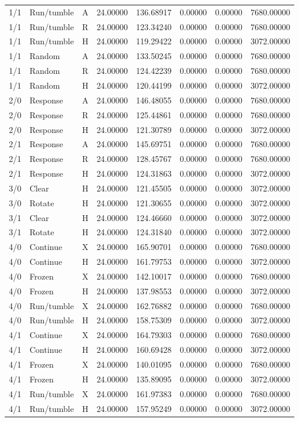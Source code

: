 \begin{longtable}{llllllll}
1/1 & Run/tumble & A & 24.00000 & 136.68917 & 0.00000 & 0.00000 & 7680.00000 \\
1/1 & Run/tumble & R & 24.00000 & 123.34240 & 0.00000 & 0.00000 & 7680.00000 \\
1/1 & Run/tumble & H & 24.00000 & 119.29422 & 0.00000 & 0.00000 & 3072.00000 \\
1/1 & Random & A & 24.00000 & 133.50245 & 0.00000 & 0.00000 & 7680.00000 \\
1/1 & Random & R & 24.00000 & 124.42239 & 0.00000 & 0.00000 & 7680.00000 \\
1/1 & Random & H & 24.00000 & 120.44199 & 0.00000 & 0.00000 & 3072.00000 \\
2/0 & Response & A & 24.00000 & 146.48055 & 0.00000 & 0.00000 & 7680.00000 \\
2/0 & Response & R & 24.00000 & 125.44861 & 0.00000 & 0.00000 & 7680.00000 \\
2/0 & Response & H & 24.00000 & 121.30789 & 0.00000 & 0.00000 & 3072.00000 \\
2/1 & Response & A & 24.00000 & 145.69751 & 0.00000 & 0.00000 & 7680.00000 \\
2/1 & Response & R & 24.00000 & 128.45767 & 0.00000 & 0.00000 & 7680.00000 \\
2/1 & Response & H & 24.00000 & 124.31863 & 0.00000 & 0.00000 & 3072.00000 \\
3/0 & Clear & H & 24.00000 & 121.45505 & 0.00000 & 0.00000 & 3072.00000 \\
3/0 & Rotate & H & 24.00000 & 121.30655 & 0.00000 & 0.00000 & 3072.00000 \\
3/1 & Clear & H & 24.00000 & 124.46660 & 0.00000 & 0.00000 & 3072.00000 \\
3/1 & Rotate & H & 24.00000 & 124.31840 & 0.00000 & 0.00000 & 3072.00000 \\
4/0 & Continue & X & 24.00000 & 165.90701 & 0.00000 & 0.00000 & 7680.00000 \\
4/0 & Continue & H & 24.00000 & 161.79753 & 0.00000 & 0.00000 & 3072.00000 \\
4/0 & Frozen & X & 24.00000 & 142.10017 & 0.00000 & 0.00000 & 7680.00000 \\
4/0 & Frozen & H & 24.00000 & 137.98553 & 0.00000 & 0.00000 & 3072.00000 \\
4/0 & Run/tumble & X & 24.00000 & 162.76882 & 0.00000 & 0.00000 & 7680.00000 \\
4/0 & Run/tumble & H & 24.00000 & 158.75309 & 0.00000 & 0.00000 & 3072.00000 \\
4/1 & Continue & X & 24.00000 & 164.79303 & 0.00000 & 0.00000 & 7680.00000 \\
4/1 & Continue & H & 24.00000 & 160.69428 & 0.00000 & 0.00000 & 3072.00000 \\
4/1 & Frozen & X & 24.00000 & 140.01095 & 0.00000 & 0.00000 & 7680.00000 \\
4/1 & Frozen & H & 24.00000 & 135.89095 & 0.00000 & 0.00000 & 3072.00000 \\
4/1 & Run/tumble & X & 24.00000 & 161.97383 & 0.00000 & 0.00000 & 7680.00000 \\
4/1 & Run/tumble & H & 24.00000 & 157.95249 & 0.00000 & 0.00000 & 3072.00000 \\
\bottomrule
\end{longtable}
